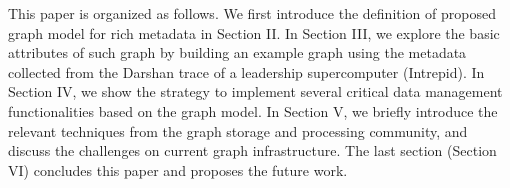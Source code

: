This paper is organized as follows. We first introduce the definition of proposed graph model for rich metadata in Section II. In Section III, we explore the basic attributes of such graph by building an example graph using the metadata collected from the Darshan trace of a leadership supercomputer (Intrepid). In Section IV, we show the strategy to implement several critical data management functionalities based on the graph model. In Section V, we briefly introduce the relevant techniques from the graph storage and processing community, and discuss the challenges on current graph infrastructure. The last section (Section VI) concludes this paper and proposes the future work. %